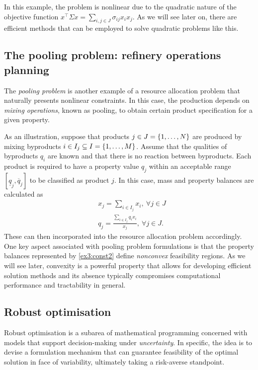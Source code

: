 \documentclass{article}
\begin{document}
In this example, the problem is nonlinear due to the quadratic nature of the objective function $x^\top\Sigma x = \sum_{i,j \in J} \sigma_{ij}x_ix_j$. As we will see later on, there are efficient methods that can be employed to solve quadratic problems like this.


\subsection{The pooling problem: refinery operations planning}

The \emph{pooling problem} is another example of a resource allocation problem that naturally presents nonlinear constraints. In this case, the production depends on \emph{mixing operations}, known as pooling, to obtain certain product specification for a given property.

As an illustration, suppose that products $j \in J = \left\{ 1,\dots,N \right \}$ are produced by mixing byproducts $i \in I_j \subseteq I = \left\{ 1,\dots,M \right \}$. Assume that the qualities of byproducts $q_i$ are known and that there is no reaction between byproducts. Each product is required to have a property value $q_j$ within an acceptable range $[\underline{q}_j, \overline{q}_j]$ to be classified as product $j$. In this case, mass and property balances are calculated as
%
\begin{align}
& x_j  = \sum_{i \in I_j}{x_i}, \ \forall j \in J \\
& q_j = \frac{\sum_{i \in I_j}q_ix_i}{x_j}, \ \forall j \in J \label{ex3:const2}.
\end{align}
%
These can then incorporated into the resource allocation problem accordingly. One key aspect associated with pooling problem formulations is that the property balances represented by \eqref{ex3:const2} define \emph{nonconvex} feasibility regions. As we will see later, convexity is a powerful property that allows for developing efficient solution methods and its absence typically compromises computational performance and tractability in general.

  
\subsection{Robust optimisation}


Robust optimisation is a subarea of mathematical programming concerned with models that support decision-making under \emph{uncertainty}. In specific, the idea is to devise a formulation mechanism that can guarantee feasibility of the optimal solution in face of variability, ultimately taking a risk-averse standpoint. 
\end{document}
